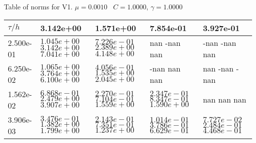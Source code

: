 \begin{center}
Table of norms for V1. $\mu = 0.0010$ \, $C = 1.0000$, $\gamma = 1.0000$
  
\begin{tabular}{|p{1in}|p{1in}|p{1in}|p{1in}|p{1in}|} \hline
$\tau / h$ &3.142e+00 &1.571e+00 &7.854e-01 &3.927e-01 \\ \hline 
2.500e-01 & $1.045e+00$  $3.142e+00$  $7.041e+00$  & $7.226e-01$  $2.389e+00$  $4.148e+00$  & nan -nan nan  & -nan -nan nan  \\ \hline 
6.250e-02 & $1.065e+00$  $3.764e+00$  $6.100e+00$  & $4.056e-01$  $1.535e+00$  $2.045e+00$  & -nan nan nan  & nan -nan -nan  \\ \hline 
1.562e-02 & $6.868e-01$  $2.479e+00$  $3.907e+00$  & $2.270e-01$  $7.104e-01$  $1.559e+00$  & $2.347e-01$  $8.347e-01$  $1.590e+00$  & nan nan nan  \\ \hline 
3.906e-03 & $3.476e-01$  $1.382e+00$  $1.799e+00$  & $2.143e-01$  $7.351e-01$  $1.237e+00$  & $1.014e-01$  $3.786e-01$  $6.629e-01$  & $7.727e-02$  $2.484e-01$  $4.468e-01$  \\ \hline 

\end{tabular}\\[20pt]
\end{center}
